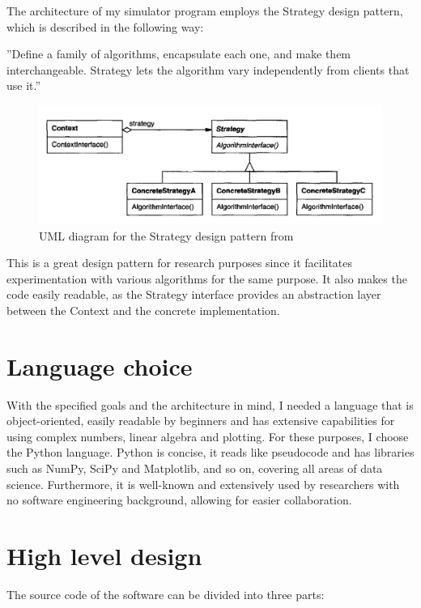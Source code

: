 The architecture of my simulator program employs the Strategy design pattern, which is described in the following way:

''Define a family of algorithms, encapsulate each one, and make them interchangeable. Strategy lets the algorithm vary independently from clients that use it.''~\cite{DesignPatterns}

\begin{figure}[H]
  \includegraphics[width=\linewidth]{./figures/program/strategy.png}
  \caption{UML diagram for the Strategy design pattern from~\cite{DesignPatterns}}
\end{figure}

This is a great design pattern for research purposes since it facilitates experimentation with various algorithms for the same purpose. It also makes the code easily readable, as the Strategy interface provides an abstraction layer between the Context and the concrete implementation.

\section{Language choice}

With the specified goals and the architecture in mind, I needed a language that is object-oriented, easily readable by beginners and has extensive capabilities for using complex numbers, linear algebra and plotting. For these purposes, I choose the Python language. Python is concise, it reads like pseudocode and has libraries such as NumPy, SciPy and Matplotlib, and so on, covering all areas of data science. Furthermore, it is well-known and extensively used by researchers with no software engineering background, allowing for easier collaboration.

\section{High level design}

The source code of the software can be divided into three parts:

